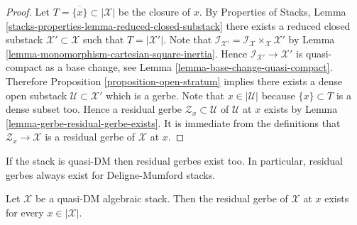 \begin{proof}
Let $T = \overline{\{x\}} \subset |\mathcal{X}|$ be the closure of $x$.
By
Properties of Stacks, Lemma
\ref{stacks-properties-lemma-reduced-closed-substack}
there exists a reduced closed substack $\mathcal{X}' \subset \mathcal{X}$
such that $T = |\mathcal{X}'|$. Note that
$\mathcal{I}_{\mathcal{X}'} =
\mathcal{I}_\mathcal{X} \times_\mathcal{X} \mathcal{X}'$ by
Lemma \ref{lemma-monomorphism-cartesian-square-inertia}.
Hence $\mathcal{I}_{\mathcal{X}'} \to \mathcal{X}'$ is
quasi-compact as a base change, see
Lemma \ref{lemma-base-change-quasi-compact}.
Therefore
Proposition \ref{proposition-open-stratum}
implies there exists a dense open substack
$\mathcal{U} \subset \mathcal{X}'$
which is a gerbe. Note that $x \in |\mathcal{U}|$ because $\{x\} \subset T$
is a dense subset too. Hence a residual gerbe
$\mathcal{Z}_x \subset \mathcal{U}$ of $\mathcal{U}$ at $x$ exists by
Lemma \ref{lemma-gerbe-residual-gerbe-exists}.
It is immediate from the definitions that $\mathcal{Z}_x \to \mathcal{X}$
is a residual gerbe of $\mathcal{X}$ at $x$.
\end{proof}

\noindent
If the stack is quasi-DM then residual gerbes exist too.
In particular, residual gerbes always exist for Deligne-Mumford stacks.

\begin{lemma}
\label{lemma-every-point-residual-gerbe-quasi-DM}
Let $\mathcal{X}$ be a quasi-DM algebraic stack.
Then the residual gerbe of $\mathcal{X}$ at $x$ exists for
every $x \in |\mathcal{X}|$.
\end{lemma}

